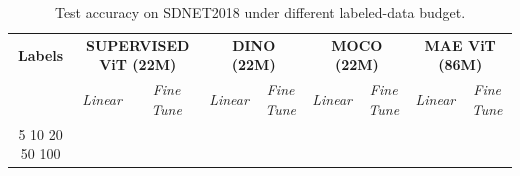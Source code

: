 \begin{table}[t]
\centering
\caption{Test accuracy on SDNET2018 under different labeled-data budget.}
\label{tab:label_efficiency}
\begin{tabular}{c|cc|cc|cc|cc}
\hline
\textbf{Labels} & \multicolumn{2}{c|}{\textbf{SUPERVISED ViT (22M)}} & \multicolumn{2}{c|}{\textbf{DINO (22M)}} & \multicolumn{2}{c|}{\textbf{MOCO (22M)}} & \multicolumn{2}{c}{\textbf{MAE ViT (86M)}} \\
 & \textit{Linear} & \textit{Fine Tune} & \textit{Linear} & \textit{Fine Tune} & \textit{Linear} & \textit{Fine Tune} & \textit{Linear} & \textit{Fine Tune} \\
\hline
5%
10%
20%
50%
100%
\hline
\end{tabular}
\end{table}
